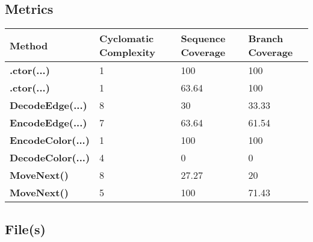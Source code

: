 \documentclass[a4paper,10pt]{article}
\begin{document}
\subsection{Metrics}
\begin{longtable}[l]{|l|l|l|l|}
\hline
\textbf{Method} & \textbf{Cyclomatic Complexity} & \textbf{Sequence Coverage} & \textbf{Branch Coverage}\\
\hline
\textbf{.ctor(...)} & 1 & 100 & 100\\
\hline
\textbf{.ctor(...)} & 1 & 63.64 & 100\\
\hline
\textbf{DecodeEdge(...)} & 8 & 30 & 33.33\\
\hline
\textbf{EncodeEdge(...)} & 7 & 63.64 & 61.54\\
\hline
\textbf{EncodeColor(...)} & 1 & 100 & 100\\
\hline
\textbf{DecodeColor(...)} & 4 & 0 & 0\\
\hline
\textbf{MoveNext()} & 8 & 27.27 & 20\\
\hline
\textbf{MoveNext()} & 5 & 100 & 71.43\\
\hline
\end{longtable}
\subsection{File(s)}
\end{document}
